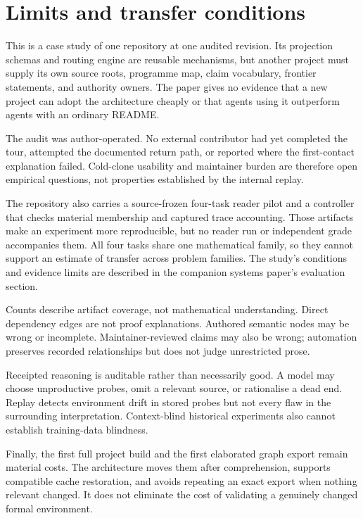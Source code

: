 \documentclass[11pt]{article}
\begin{document}
\section{Limits and transfer conditions}\label{sec:limits}

This is a case study of one repository at one audited revision. Its projection
schemas and routing engine are reusable mechanisms, but another project must
supply its own source roots, programme map, claim vocabulary, frontier
statements, and authority owners. The paper gives no evidence that a new
project can adopt the architecture cheaply or that agents using it outperform
agents with an ordinary README.

The audit was author-operated. No external contributor had yet completed the
tour, attempted the documented return path, or reported where the first-contact
explanation failed. Cold-clone usability and maintainer burden are therefore
open empirical questions, not properties established by the internal replay.

The repository also carries a source-frozen four-task reader pilot and a
controller that checks material membership and captured trace accounting.
Those artifacts make an experiment more reproducible, but no reader run or
independent grade accompanies them. All four tasks share one mathematical
family, so they cannot support an estimate of transfer across problem families.
The study's conditions and evidence limits are described in the companion
systems paper's evaluation section.

Counts describe artifact coverage, not mathematical understanding. Direct
dependency edges are not proof explanations. Authored semantic nodes may be
wrong or incomplete. Maintainer-reviewed claims may also be wrong; automation
preserves recorded relationships but does not judge unrestricted prose.

Receipted reasoning is auditable rather than necessarily good. A model may
choose unproductive probes, omit a relevant source, or rationalise a dead end.
Replay detects environment drift in stored probes but not every flaw in the
surrounding interpretation. Context-blind historical experiments also cannot
establish training-data blindness.

Finally, the first full project build and the first elaborated graph export
remain material costs. The architecture moves them after comprehension,
supports compatible cache restoration, and avoids repeating an exact export
when nothing relevant changed. It does not eliminate the cost of validating a
genuinely changed formal environment.
\end{document}

